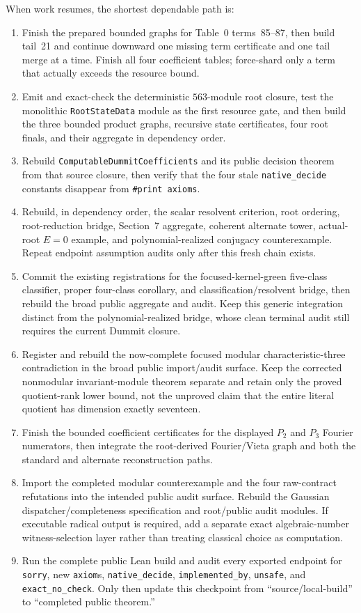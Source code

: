 \documentclass[11pt,a4paper,oneside]{article}
\newcommand{\lean}[1]{\nolinkurl{#1}}
\begin{document}
When work resumes, the shortest dependable path is:

\begin{enumerate}
\item Finish the prepared bounded graphs for Table~0 terms~85--87, then build
  tail~21 and continue downward one missing term certificate and one tail
  merge at a time.  Finish all four coefficient tables; force-shard only a
  term that actually exceeds the resource bound.
\item Emit and exact-check the deterministic $563$-module root closure, test
  the monolithic \lean{RootStateData} module as the first resource gate, and
  then build the three bounded product graphs, recursive state certificates,
  four root finals, and their aggregate in dependency order.
\item Rebuild \lean{ComputableDummitCoefficients} and its public decision
  theorem from that source closure, then verify that the four stale
  \lean{native_decide} constants disappear from \texttt{\#print axioms}.
\item Rebuild, in dependency order, the scalar resolvent criterion, root
  ordering, root-reduction bridge, Section~7 aggregate, coherent alternate
  tower, actual-root $E=0$ example, and polynomial-realized conjugacy
  counterexample.  Repeat endpoint assumption audits only after this fresh
  chain exists.
\item Commit the existing registrations for the focused-kernel-green
  five-class classifier, proper four-class corollary, and
  classification/resolvent bridge, then rebuild the broad public aggregate
  and audit.  Keep this generic integration distinct from the
  polynomial-realized bridge, whose clean terminal audit still requires the
  current Dummit closure.
\item Register and rebuild the now-complete focused modular
  characteristic-three contradiction in the broad public import/audit
  surface.  Keep the corrected nonmodular invariant-module theorem separate
  and retain only the proved quotient-rank lower bound, not the unproved claim
  that the entire literal quotient has dimension exactly seventeen.
\item Finish the bounded coefficient certificates for the displayed
  $P_2$ and $P_3$ Fourier numerators, then integrate the root-derived
  Fourier/Vieta graph and both the standard and alternate reconstruction
  paths.
\item Import the completed modular counterexample and the four raw-contract
  refutations into the intended public audit surface.  Rebuild the Gaussian
  dispatcher/completeness specification and root/public audit modules.  If
  executable radical output is required, add a separate exact algebraic-number
  witness-selection layer rather than treating classical choice as
  computation.
\item Run the complete public Lean build and audit every exported endpoint for
  \lean{sorry}, new \lean{axiom}s, \lean{native_decide},
  \lean{implemented_by}, \lean{unsafe}, and \lean{exact_no_check}.  Only then
  update this checkpoint from ``source/local-build'' to ``completed public
  theorem.''
\end{enumerate}
\end{document}
